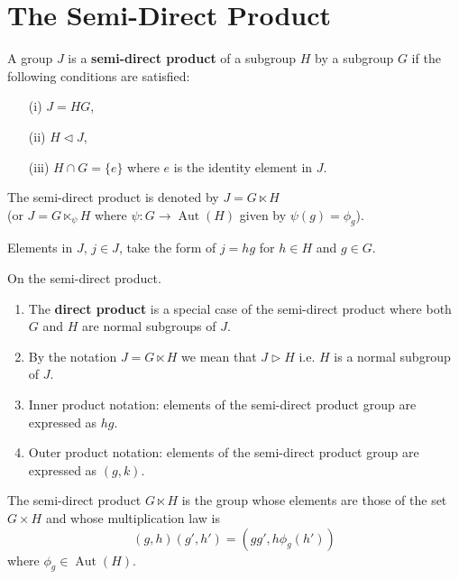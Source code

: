 \documentclass[12pt, a4paper]{article}
\DeclareMathOperator{\aut}{Aut}
\begin{document}
\pagebreak

\section{The Semi-Direct Product}

\begin{definition}
    A group \(J\) is a \textbf{semi-direct product} of a subgroup \(H\) by a subgroup \(G\) if the following conditions are satisfied:
    \begin{enumerate}
        \item[(i)] \(J=HG\),
        \item[(ii)] \(H \triangleleft J\),
        \item[(iii)] \(H \cap G =\{e\}\) where \(e\) is the identity element in \(J\).
    \end{enumerate}
    The semi-direct product is denoted by \(J=G \ltimes H\) \\(or \(J=G \ltimes_{\psi} H\) where \(\psi: G \to \aut(H)\) given by \(\psi(g)=\phi_g\)).
\end{definition}

\begin{mdnote}
    Elements in \(J\), \(j\in J\), take the form of \(j=hg\) for \(h \in H\) and \(g \in G\).
\end{mdnote}

\begin{mdremark}
    On the semi-direct product.
    \begin{enumerate}
        \item The \textbf{direct product} is a special case of the semi-direct product where both \(G\) and \(H\) are normal subgroups of \(J\).
        \item By the notation \(J = G \ltimes H\) we mean that \(J \triangleright H\) i.e. \(H\) is a normal subgroup of \(J\).
        \item Inner product notation: elements of the semi-direct product group are expressed as \(hg\).
        \item Outer product notation: elements of the semi-direct product group are expressed as \((g,k)\).
    \end{enumerate}
\end{mdremark}

\begin{definition}
    The semi-direct product \(G \ltimes H\) is the group whose elements are those of the set \(G \times H\) and whose multiplication law is 
    \[(g,h)(g',h')=(gg',h\phi_g(h'))\]
    where \(\phi_g \in \aut(H)\).
\end{definition}
\end{document}

